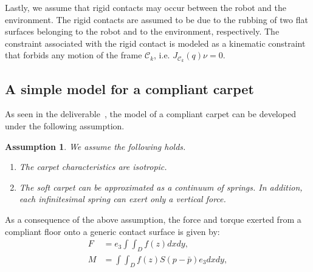\documentclass[12pt,a4paper,twoside]{article}
\newtheorem{assumption}{\bf{Assumption}}
\begin{document}
Lastly, we assume that  rigid contacts may occur between the robot and the environment. The rigid contacts are assumed to be due to the rubbing of two flat surfaces belonging to the robot and to the environment, respectively.
The constraint associated with the rigid contact is  modeled as a kinematic constraint that forbids any motion of the frame $\mathcal{C}_k$, i.e. ${J}_{\mathcal{C}_k}(q) {\nu} = 0$.

\subsection{A simple model for a compliant carpet} 
\label{sec:modelCarpet}
\begin{figure}[t]
\end{figure}
As seen in the deliverable~\cite{deliverable}, the model of a compliant carpet can be developed under the following assumption. 
\begin{assumption}
\label{hp:uniformity} 
We assume the following holds.
\begin{enumerate}
    \item The carpet characteristics are isotropic.
    \item The soft carpet can be approximated as a continuum of springs. In addition, each infinitesimal spring can  exert only a vertical force.
\end{enumerate}
\end{assumption}
As a consequence of the above assumption,
 the force and torque exerted from a compliant floor onto  a generic contact surface is given by:
\begin{subequations}
\label{forceTorque3DGeneral}
    \begin{alignat}{2}
\label{eq:forcesDist3DE}
F &= e_3 \int\int_{{D}} f(z) dx dy, \\
\label{eq:torqueDist3DE}
M &= 
\int \int_{{D}}
f(z)S(p-\bar{p})e_3 dx dy, 
    \end{alignat}
\end{subequations}
\end{document}
